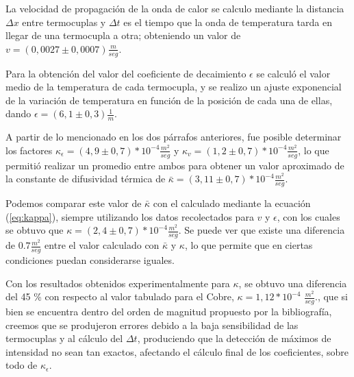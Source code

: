 \documentclass[twoside,twocolumn,a4paper]{article}
\begin{document}
\par
La velocidad de propagaci\'on de la onda de calor se calculo mediante la distancia $\Delta x$ entre termocuplas y $\Delta t$ es el tiempo que la onda de temperatura tarda en llegar de una termocupla a otra; obteniendo un valor de $v = (0,0027 \pm 0,0007) \frac{m}{seg}$. \newline

\par
Para la obtenci\'on del valor del coeficiente de decaimiento $\epsilon$ se calcul\'o el valor medio de la temperatura de cada termocupla, y se realizo un ajuste exponencial de la variaci\'on de temperatura en funci\'on de la posici\'on de cada una de ellas, dando $\epsilon = (6,1 \pm 0,3) \frac{1}{m}$. \newline

\par
A partir de lo mencionado en los dos p\'arrafos anteriores, fue posible determinar los factores $\kappa_{\epsilon} = (4,9 \pm 0,7) * 10^{-4} \frac{m^{2}}{seg}$ y $\kappa_{v} = (1,2 \pm 0,7) * 10^{-4} \frac{m^{2}}{seg}$, lo que permiti\'o realizar un promedio entre ambos para obtener un valor aproximado de la constante de difusividad t\'ermica de $\bar{\kappa} = (3,11 \pm 0,7) * 10^{-4}  \frac{m^{2}}{seg}$.

Podemos comparar este valor de $\bar{\kappa}$ con el calculado mediante la ecuaci\'on (\ref{eq:kappa}), siempre utilizando los datos recolectados para $v$ y $\epsilon$, con los cuales se obtuvo que $\kappa = (2,4 \pm 0,7) * 10^{-4} \frac{m^{2}}{seg}$. Se puede ver que existe una diferencia de $0.7\frac{m^{2}}{seg}$ entre el valor calculado con $\bar{\kappa}$ y $\kappa$, lo que permite que en ciertas condiciones puedan considerarse iguales. \newline

\par
Con los resultados obtenidos experimentalmente para $\kappa$, se obtuvo una diferencia del 45 \% con respecto al valor tabulado para el Cobre, $\kappa = 1,12 * 10^{-4}$ $\frac{m^{2}}{seg}$., que si bien se encuentra dentro del orden de magnitud propuesto por la bibliograf\'ia, creemos que se produjeron errores debido a la baja sensibilidad de las termocuplas y al c\'alculo del $\Delta t$, produciendo que la detecci\'on de m\'aximos de intensidad no sean tan exactos, afectando el c\'alculo final de los coeficientes, sobre todo de $\kappa_{\epsilon}$.
\end{document}
